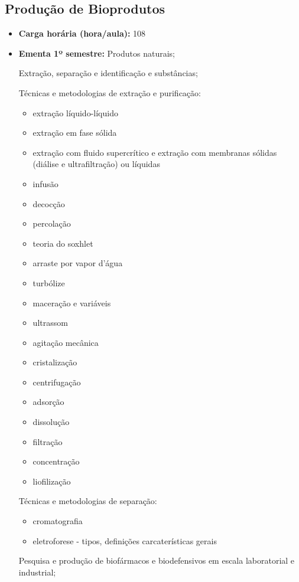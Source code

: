 \documentclass[11pt,fleqn]{book} %
\begin{document}
\subsection{Produção de Bioprodutos}\label{disc:producao}
\begin{itemize}
	\item \textbf{Carga horária (hora/aula):} 108
	\item \textbf{Ementa 1º semestre:}
	Produtos naturais;
	
	Extração, separação e identificação e substâncias;
	
	Técnicas e metodologias de extração e purificação: 
	\begin{itemize}
		\item extração líquido-líquido
		\item extração em fase sólida
		\item extração com fluido supercrítico e extração com membranas sólidas (diálise e ultrafiltração) ou líquidas
		\item infusão
		\item decocção
		\item percolação
		\item teoria do soxhlet
		\item arraste por vapor d’água
		\item turbólize
		\item maceração e variáveis
		\item ultrassom
		\item agitação mecânica
		\item cristalização
		\item centrifugação
		\item adsorção
		\item dissolução
		\item filtração
		\item concentração
		\item liofilização
	\end{itemize}
	
	Técnicas e metodologias de separação: 
	
	\begin{itemize}
		\item cromatografia
		\item eletroforese - tipos, definições carcaterísticas gerais
	\end{itemize}
	
	Pesquisa e produção de biofármacos e biodefensivos em escala laboratorial e industrial;
	

\end{itemize}
\end{document}
